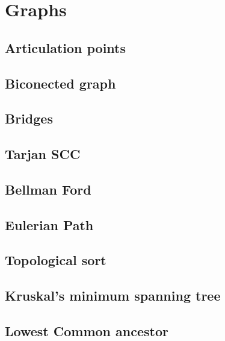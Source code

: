 \section{Graphs}
\subsection{Articulation points}
\raggedbottom
\hrulefill
\subsection{Biconected graph}
\raggedbottom
\hrulefill
\subsection{Bridges}
\raggedbottom
\hrulefill
\subsection{Tarjan SCC}
\raggedbottom
\hrulefill
\subsection{Bellman Ford}
\raggedbottom
\hrulefill
\subsection{Eulerian Path}
\raggedbottom
\hrulefill
\subsection{Topological sort}
\raggedbottom
\hrulefill
\subsection{Kruskal's minimum spanning tree}
\raggedbottom
\hrulefill
\subsection{Lowest Common ancestor}
\raggedbottom
\hrulefill

